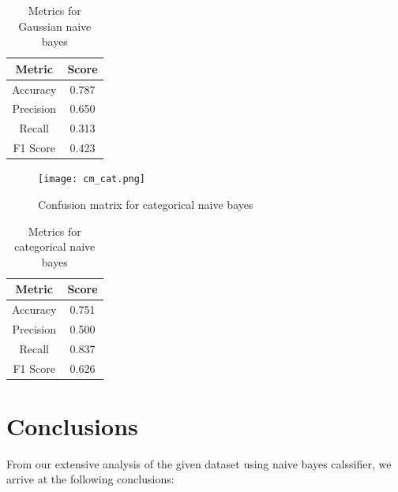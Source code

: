 \documentclass[conference]{IEEEtran}
\begin{document}
\begin{table}
\begin{center}

\caption{Metrics for Gaussian naive bayes}

\begin{tabular}{| c| c| }
 \hline
 Metric & Score \\
 \hline
 \hline
 Accuracy & 0.787 \\ 
 \hline
 Precision & 0.650 \\   
 \hline
 Recall &  0.313 \\
 \hline
 F1 Score & 0.423 \\
 \hline

\end{tabular}

\label{gauss_metric_table}
\end{center}

\end{table}

\begin{figure}[tbh]
\centering
\texttt{[image: cm\_cat.png]}
\caption{Confusion matrix for categorical naive bayes}
\label{cm_cat}
\end{figure}

\begin{table}
\begin{center}

\caption{Metrics for categorical naive bayes}

\begin{tabular}{| c| c| }
 \hline
 Metric & Score \\
 \hline
 \hline
 Accuracy & 0.751 \\ 
 \hline
 Precision & 0.500 \\   
 \hline
 Recall &  0.837 \\
 \hline
 F1 Score & 0.626 \\
 \hline

\end{tabular}

\label{cat_metric_table}
\end{center}

\end{table}

\section{Conclusions}

From our extensive analysis of the given dataset using naive bayes calssifier, we arrive at the following conclusions:
\end{document}
